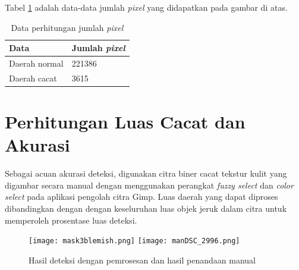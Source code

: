 \documentclass[laporan.tex]{subfiles}
\begin{document}
Tabel \ref{table:pixelcountexample} adalah data-data jumlah \emph{pixel} yang didapatkan pada gambar di atas.

\begin{table}[h!]
\centering
\begin{tabular}{|l|l|}
\hline
Data & Jumlah \emph{pixel} \\
\hline
Daerah normal & 221386 \\
Daerah cacat & 3615 \\
\hline
\end{tabular}
\caption{Data perhitungan jumlah \emph{pixel}}
\label{table:pixelcountexample}
\end{table}

\section{Perhitungan Luas Cacat dan Akurasi}

Sebagai acuan akurasi deteksi, digunakan citra biner cacat tekstur kulit yang digambar secara manual dengan menggunakan perangkat \emph{fuzzy select} dan \emph{color select} pada aplikasi pengolah citra Gimp. Luas daerah yang dapat diproses dibandingkan dengan dengan keseluruhan luas objek jeruk dalam citra untuk memperoleh prosentase luas deteksi.

\begin{figure}[h!]
\centering
\texttt{[image: mask3blemish.png]} \qquad
\texttt{[image: manDSC\_2996.png]}
\caption{Hasil deteksi dengan pemrosesan dan hasil penandaan manual}
\end{figure}
\end{document}
